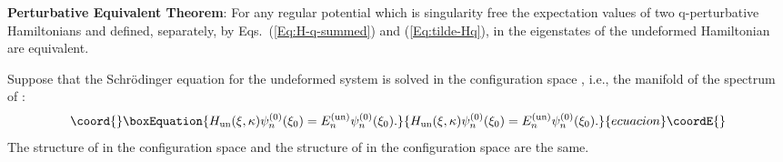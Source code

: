 \documentclass[a4paper,12pt]{article}
\begin{document}
{\bf Perturbative Equivalent Theorem}:  For any regular potential  which 
is singularity free the expectation
 values of two q-perturbative Hamiltonians \coordHE{} 
and \coordHE{} defined,  separately, by 
 Eqs.~(\ref{Eq:H-q-summed}) and (\ref{Eq:tilde-Hq}), 
 in the eigenstates of the undeformed  Hamiltonian are equivalent.

Suppose that the Schr\"odinger equation for the undeformed system is solved in 
the configuration space \coordHE{}, i.e., the manifold of the spectrum \coordHE{} of 
\myHighlight{$\xi$}\coordHE{}:
\begin{equation}\coord{}\boxEquation{                          
\label{Eq:Hun-xi}  
H_{\rm un}(\xi,\kappa)\psi_n^{(0)}(\xi_0)=
E^{\rm (un)}_n\psi_n^{(0)}(\xi_0).
}{                          
H_{\rm un}(\xi,\kappa)\psi_n^{(0)}(\xi_0)=
E^{\rm (un)}_n\psi_n^{(0)}(\xi_0).
}{ecuacion}\coordE{}\end{equation}
The structure of \coordHE{} in the configuration space 
\coordHE{} and the structure of \coordHE{} in the 
configuration space \coordHE{} are the same.
\end{document}
